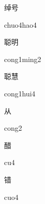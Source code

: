 \begin{verbete}{绰号}
\begin{pronuncia}{chuo4hao4}
\end{pronuncia}
\end{verbete}

\begin{verbete}{聪明}
\begin{pronuncia}{cong1ming2}
\end{pronuncia}
\end{verbete}

\begin{verbete}{聪慧}
\begin{pronuncia}{cong1hui4}
\end{pronuncia}
\end{verbete}

\begin{verbete}[cong2]{从}
\begin{pronuncia}{cong2}
\end{pronuncia}
\end{verbete}

\begin{verbete}[cu4]{醋}
\begin{pronuncia}{cu4}
\end{pronuncia}
\end{verbete}

\begin{verbete}[cuo4]{错}
\begin{pronuncia}{cuo4}
\end{pronuncia}
\end{verbete}

